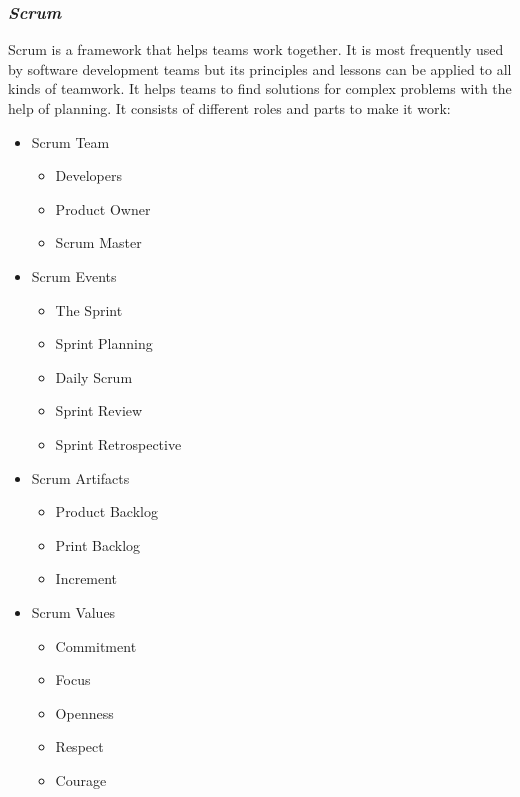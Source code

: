 \pagebreak
\subsubsection*{\textit{Scrum}}
\label{scrum_section}
Scrum is a framework that helps teams work together. It is most frequently used by software development teams but its principles and lessons can be applied to all kinds of teamwork. It helps teams to find solutions for complex problems with the help of planning. It consists of different roles and parts to make it work:

\begin{multicols}{2}
    \begin{itemize}
        \item Scrum Team
        \begin{itemize}
            \item Developers
            \item Product Owner
            \item Scrum Master
        \end{itemize}
    \end{itemize}
    \begin{itemize}
        \item Scrum Events
        \begin{itemize}
            \item The Sprint
            \item Sprint Planning
            \item Daily Scrum
            \item Sprint Review
            \item Sprint Retrospective
        \end{itemize}
    \end{itemize}
    \columnbreak
    \begin{itemize}
        \item Scrum Artifacts
        \begin{itemize}
            \item Product Backlog
            \item Print Backlog
            \item Increment
        \end{itemize}
    \end{itemize}
    \begin{itemize}
        \item Scrum Values
        \begin{itemize}
            \item Commitment
            \item Focus
            \item Openness
            \item Respect
            \item Courage
        \end{itemize}
    \end{itemize}
\end{multicols}

